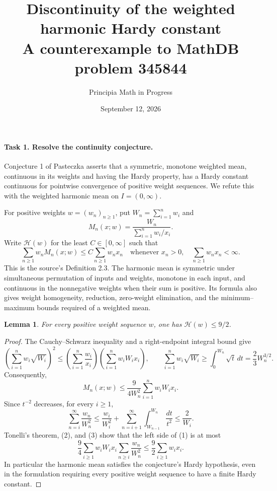 \documentclass[11pt]{article}
\title{Discontinuity of the weighted harmonic Hardy constant\\
\large A counterexample to MathDB problem 345844}
\author{Principia Math in Progress}
\date{September 12, 2026}
\newtheorem{lemma}[theorem]{Lemma}
\newcommand{\HM}{\mathscr H}
\begin{document}
\maketitle

\paragraph{Task 1. Resolve the continuity conjecture.}
Conjecture 1 of Pasteczka \cite[p.~1061]{P} asserts that a symmetric,
monotone weighted mean, continuous in its weights and having the
Hardy property, has a Hardy constant continuous for pointwise
convergence of positive weight sequences. We refute this with the
weighted harmonic mean on \(I=(0,\infty)\).

For positive weights \(w=(w_n)_{n\ge1}\), put \(W_n=\sum_{i=1}^n w_i\) and
\[
 M_n(x;w)=\frac{W_n}{\sum_{i=1}^n w_i/x_i}.
\]
Write \(\HM(w)\) for the least \(C\in[0,\infty]\) such that
\[
 \sum_{n\ge1}w_nM_n(x;w)\le C\sum_{n\ge1}w_nx_n
 \quad\text{whenever }x_n>0,\quad \sum_{n\ge1}w_nx_n<\infty.
 \tag{1}
\]
This is the source's Definition 2.3. The harmonic mean is symmetric
under simultaneous permutation of inputs and weights, monotone in
each input, and continuous in the nonnegative weights when their
sum is positive. Its formula also gives weight homogeneity, reduction,
zero-weight elimination, and the minimum--maximum bounds required
of a weighted mean.

\begin{lemma}\label{lem:upper}
For every positive weight sequence \(w\), one has \(\HM(w)\le9/2\).
\end{lemma}
\begin{proof}
The Cauchy--Schwarz inequality and a right-endpoint integral bound give
\[
 \left(\sum_{i=1}^n w_i\sqrt{W_i}\right)^2
 \le\left(\sum_{i=1}^n\frac{w_i}{x_i}\right)
       \left(\sum_{i=1}^n w_iW_ix_i\right),\qquad
 \sum_{i=1}^n w_i\sqrt{W_i}\ge\int_0^{W_n}\sqrt t\,dt
 =\frac23W_n^{3/2}.
\]
Consequently,
\[
 M_n(x;w)\le\frac{9}{4W_n^2}\sum_{i=1}^n w_iW_ix_i.
 \tag{2}
\]
Since \(t^{-2}\) decreases, for every \(i\ge1\),
\[
 \sum_{n=i}^{\infty}\frac{w_n}{W_n^2}
 \le\frac{w_i}{W_i^2}
   +\sum_{n=i+1}^{\infty}\int_{W_{n-1}}^{W_n}\frac{dt}{t^2}
 \le\frac2{W_i}.
 \tag{3}
\]
Tonelli's theorem, (2), and (3) show that the left side of (1) is at most
\[
 \frac94\sum_{i\ge1}w_iW_ix_i
             \sum_{n\ge i}\frac{w_n}{W_n^2}
 \le\frac92\sum_{i\ge1}w_ix_i.
\]
In particular the harmonic mean satisfies the conjecture's Hardy
hypothesis, even in the formulation requiring every positive
weight sequence to have a finite Hardy constant.
\end{proof}
\end{document}
